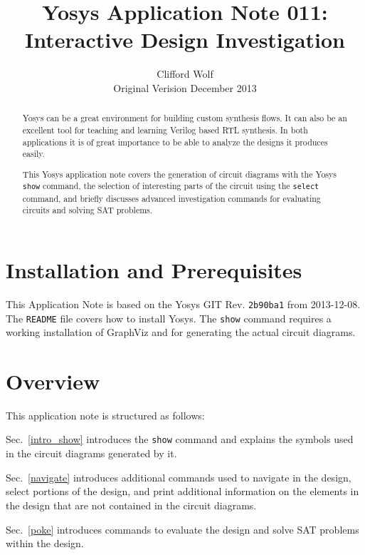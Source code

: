 \documentclass[9pt,technote,a4paper]{IEEEtran}
\begin{document}
\title{Yosys Application Note 011: \\ Interactive Design Investigation}
\author{Clifford Wolf \\ Original Verision December 2013}
\maketitle

\begin{abstract}
Yosys \cite{yosys} can be a great environment for building custom synthesis
flows. It can also be an excellent tool for teaching and learning Verilog based
RTL synthesis. In both applications it is of great importance to be able to
analyze the designs it produces easily.

This Yosys application note covers the generation of circuit diagrams with the
Yosys {\tt show} command, the selection of interesting parts of the circuit
using the {\tt select} command, and briefly discusses advanced investigation
commands for evaluating circuits and solving SAT problems.
\end{abstract}

\section{Installation and Prerequisites}

This Application Note is based on the Yosys \cite{yosys} GIT Rev. {\tt 2b90ba1} from
2013-12-08. The {\tt README} file covers how to install Yosys. The
{\tt show} command requires a working installation of GraphViz \cite{graphviz}
and \cite{xdot} for generating the actual circuit diagrams.

\section{Overview}

This application note is structured as follows:

Sec.~\ref{intro_show} introduces the {\tt show} command and explains the
symbols used in the circuit diagrams generated by it.

Sec.~\ref{navigate} introduces additional commands used to navigate in the
design, select portions of the design, and print additional information on
the elements in the design that are not contained in the circuit diagrams.

Sec.~\ref{poke} introduces commands to evaluate the design and solve SAT
problems within the design.
\end{document}
